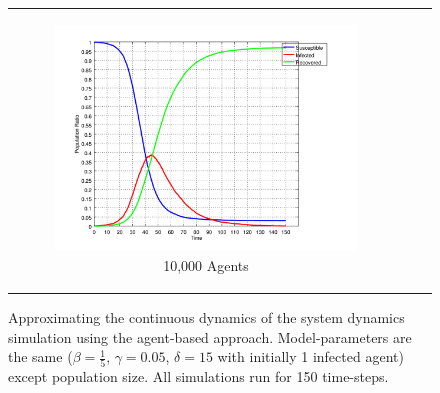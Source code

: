 \begin{figure}
\begin{center}
\begin{tabular}{c c c}
\begin{subfigure}[b]{0.3\textwidth}
			\centering
			\includegraphics[width=1\textwidth, angle=0]{./../shared/fig/frabs/SIR_10000agents_150t_01dt_parallel.png}
			\caption{10,000 Agents}
			\label{fig:hac_seq}
		\end{subfigure}
	\end{tabular}
	
	\caption{Approximating the continuous dynamics of the system dynamics simulation using the agent-based approach. Model-parameters are the same ($\beta = \frac{1}{5}$, $\gamma = 0.05$, $\delta = 15$ with initially 1 infected agent) except population size. All simulations run for 150 time-steps.} 
	\label{fig:sir_abs_anylogic_agents}
\end{center}
\end{figure}

